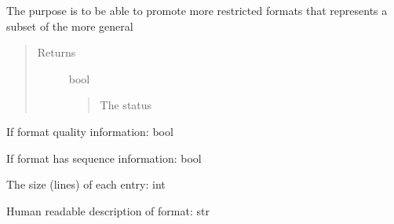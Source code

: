 \documentclass[letterpaper,10pt,english]{sphinxmanual}
\begin{document}
\begin{fulllineitems}
\begin{fulllineitems}
The purpose is to be able to promote more restricted formats that
represents a subset of the more general
\begin{quote}\begin{description}
\item[{Returns}] \leavevmode
bool
\begin{quote}

The status
\end{quote}

\end{description}\end{quote}

\end{fulllineitems}


\begin{fulllineitems}
\label{fseq.reading:fseq.reading.seq_encoder.SeqFormat.hasQuality}
If format quality information: bool

\end{fulllineitems}


\begin{fulllineitems}
\label{fseq.reading:fseq.reading.seq_encoder.SeqFormat.hasSequence}
If format has sequence information: bool

\end{fulllineitems}


\begin{fulllineitems}
\label{fseq.reading:fseq.reading.seq_encoder.SeqFormat.itemSize}
The size (lines) of each entry: int

\end{fulllineitems}


\begin{fulllineitems}
\label{fseq.reading:fseq.reading.seq_encoder.SeqFormat.name}
Human readable description of format: str

\end{fulllineitems}



\end{fulllineitems}
\end{document}
